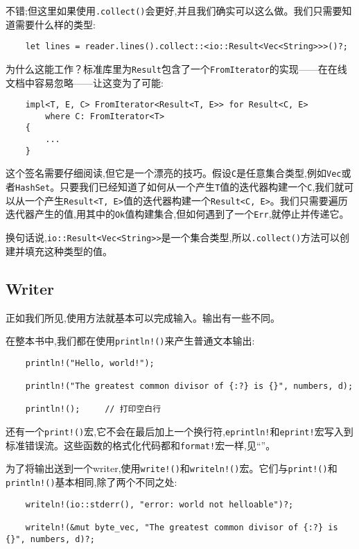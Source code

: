 不错;但这里如果使用\texttt{.collect()}会更好,并且我们确实可以这么做。我们只需要知道需要什么样的类型:
\begin{verbatim}
    let lines = reader.lines().collect::<io::Result<Vec<String>>>()?;
\end{verbatim}

为什么这能工作？标准库里为\texttt{Result}包含了一个\texttt{FromIterator}的实现——在在线文档中容易忽略——让这变为了可能:
\begin{verbatim}
    impl<T, E, C> FromIterator<Result<T, E>> for Result<C, E>
        where C: FromIterator<T>
    {
        ...
    }
\end{verbatim}
这个签名需要仔细阅读,但它是一个漂亮的技巧。假设\texttt{C}是任意集合类型,例如\texttt{Vec}或者\texttt{HashSet}。只要我们已经知道了如何从一个产生\texttt{T}值的迭代器构建一个\texttt{C},我们就可以从一个产生\texttt{Result<T, E>}值的迭代器构建一个\texttt{Result<C, E>}。我们只需要遍历迭代器产生的值,用其中的\texttt{Ok}值构建集合,但如何遇到了一个\texttt{Err},就停止并传递它。

换句话说,\texttt{io::Result<Vec<String>>}是一个集合类型,所以\texttt{.collect()}方法可以创建并填充这种类型的值。

\subsection{Writer}
正如我们所见,使用方法就基本可以完成输入。输出有一些不同。

在整本书中,我们都在使用\texttt{println!()}来产生普通文本输出:
\begin{verbatim}
    println!("Hello, world!");

    println!("The greatest common divisor of {:?} is {}", numbers, d);

    println!();     // 打印空白行
\end{verbatim}

还有一个\texttt{print!()}宏,它不会在最后加上一个换行符,\texttt{eprintln!}和\texttt{eprint!}宏写入到标准错误流。这些函数的格式化代码都和\texttt{format!}宏一样,见“”。

为了将输出送到一个writer,使用\texttt{write!()}和\texttt{writeln!()}宏。它们与\texttt{print!()}和\texttt{println!()}基本相同,除了两个不同之处:
\begin{verbatim}
    writeln!(io::stderr(), "error: world not helloable")?;

    writeln!(&mut byte_vec, "The greatest common divisor of {:?} is {}", numbers, d)?;
\end{verbatim}

